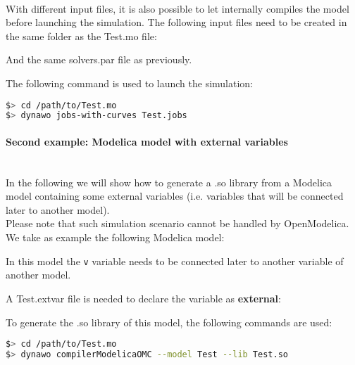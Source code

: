 \documentclass[a4paper, 12pt]{report}
\begin{document}
~~\\
With different input files, it is also possible to let \Dynawo
internally compiles the model before launching the simulation. The following input files need to be created in the same folder as the Test.mo file:




And the same solvers.par file as previously.

The following command is used to launch the simulation:
\begin{lstlisting}[language=bash,deletekeywords={jobs,help}]
$> cd /path/to/Test.mo
$> dynawo jobs-with-curves Test.jobs
\end{lstlisting}

\paragraph{Second example: Modelica model with external variables}
\label{Dynawo_Advanced_Documentation_Dynawo_executables_execDynawo_second_example}
~~\\
In the following we will show how to generate a .so library from a
Modelica model containing some external variables (i.e. variables that will be connected later to another model). \\

Please note that such simulation scenario cannot be handled by OpenModelica. \\

We take as example the following Modelica model:

In this model the \lstinline[language=Modelica]{v} variable needs to be connected later to another variable of another model.

A Test.extvar file is needed to declare the variable as \textbf{external}:



To generate the .so library of this model, the following commands are used:
\begin{lstlisting}[language=bash,deletekeywords={jobs,help}]
$> cd /path/to/Test.mo
$> dynawo compilerModelicaOMC --model Test --lib Test.so
\end{lstlisting}
\end{document}
